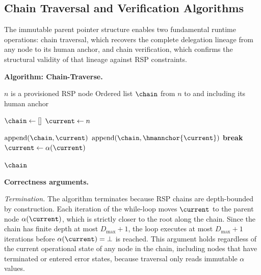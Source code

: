 \subsection{Chain Traversal and Verification Algorithms}
\label{sec:chain-traversal}

The immutable parent pointer structure enables two fundamental runtime operations: chain traversal, which recovers the complete delegation lineage from any node to its human anchor, and chain verification, which confirms the structural validity of that lineage against RSP constraints.

\bigskip
\noindent\textbf{Algorithm: Chain-Traverse.}

\begin{algorithm}
\caption{Chain-Traverse($n$) --- Recover the delegation chain from node $n$ to human anchor}
\label{alg:chain-traverse}
\begin{algorithmic}[1]
\REQUIRE $n$ is a provisioned RSP node
\ENSURE Ordered list $\chain$ from $n$ to and including its human anchor

\STATE $\chain \leftarrow []$
\STATE $\current \leftarrow n$ 

    \STATE $\text{append}(\chain, \current)$ 
    \IF{$\alpha(\current) = \bot$}
        \STATE $\text{append}(\chain, \hmannchor{\current})$ 
        \STATE \textbf{break}
    \ENDIF
    \STATE $\current \leftarrow \alpha(\current)$ 
\ENDWHILE

\RETURN $\chain$
\end{algorithmic}
\end{algorithm}

\bigskip
\noindent\textbf{Correctness arguments.}

\textit{Termination.} The algorithm terminates because RSP chains are depth-bounded by construction. Each iteration of the while-loop moves $\current$ to the parent node $\alpha(\current)$, which is strictly closer to the root along the chain. Since the chain has finite depth at most $D_{\max} + 1$, the loop executes at most $D_{\max} + 1$ iterations before $\alpha(\current) = \bot$ is reached. This argument holds regardless of the current operational state of any node in the chain, including nodes that have terminated or entered error states, because traversal only reads immutable $\alpha$ values.


